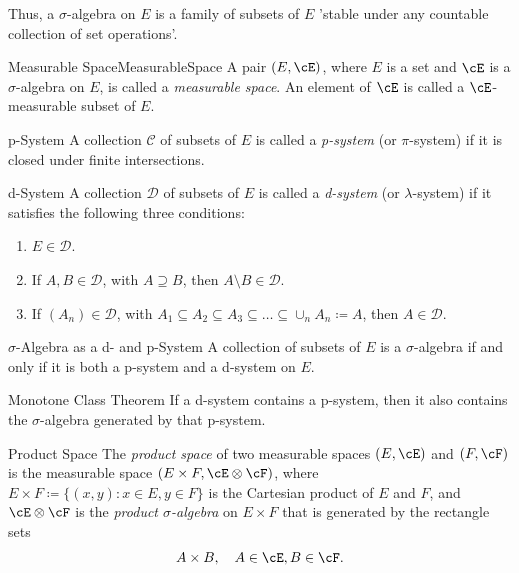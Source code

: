 Thus, a \(\sigma\)-algebra on \(E\) is a family of subsets of \(E\) 'stable under any countable collection of set operations'.

\begin{defn}{Measurable Space}{MeasurableSpace}
	A pair \((E, \cE)\), where \(E\) is a set and \(\cE\) is a \(\sigma\)-algebra on \(E\), is called a \textit{measurable space}. An element of \(\cE\) is called a \(\cE\)-measurable subset of \(E\).
\end{defn}

\begin{defn}{p-System}{}
	A collection $\mathcal{C}$ of subsets of $E$ is called a \textit{p-system} (or $\pi$-system) if it is closed under finite intersections.
\end{defn}

\begin{defn}{d-System}{}
	A collection $\mathcal{D}$ of subsets of $E$ is called a \textit{d-system} (or $\lambda$-system) if it satisfies the following three conditions:
	\begin{enumerate}
		\item $E \in \mathcal{D}$.
		\item If $A, B \in \mathcal{D}$, with $A \supseteq B$, then $A \setminus B \in \mathcal{D}$.
		\item If $(A_n) \in \mathcal{D}$, with $A_1 \subseteq A_2 \subseteq A_3 \subseteq \dots \subseteq \cup_n A_n \coloneqq A$, then $A \in \mathcal{D}$.
	\end{enumerate}
\end{defn}

\begin{thm}{$\sigma$-Algebra as a d- and p-System}{}
	A collection of subsets of $E$ is a $\sigma$-algebra if and only if it is both a p-system and a d-system on $E$.
\end{thm}

\begin{thm}{Monotone Class Theorem}{}
	If a d-system contains a p-system, then it also contains the $\sigma$-algebra generated by that p-system.
\end{thm}

\begin{defn}{Product Space}{}
	The \textit{product space} of two measurable spaces $(E, \cE)$ and $(F, \cF)$ is the measurable space $(E \times F, \cE \otimes \cF)$, where $E \times F \coloneqq \{(x, y) : x \in E, y \in F\}$ is the Cartesian product of $E$ and $F$, and $\cE \otimes \cF$ is the \textit{product $\sigma$-algebra} on $E \times F$ that is generated by the rectangle sets
	\begin{equation*}
		A \times B, \quad A \in \cE, B \in \cF.
	\end{equation*}
\end{defn}

